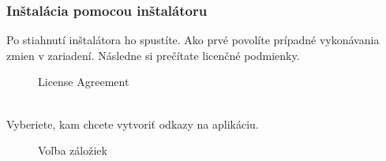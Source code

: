 \documentclass[a4paper, 11pt]{article}
\begin{document}
            \subsubsection{Inštalácia pomocou inštalátoru}
            Po stiahnutí inštalátora ho spustíte. Ako prvé povolíte prípadné vykonávania zmien v zariadení. Následne si prečítate licenčné podmienky.
                \begin{figure}[h]
                    \centering
                        \caption{License Agreement}
                \end{figure}
            \vspace{10mm}
            \\Vyberiete, kam chcete vytvoriť odkazy na aplikáciu.
                \begin{figure}[h]
                    \centering
                        \caption{Voľba záložiek}
                \end{figure}
\end{document}
